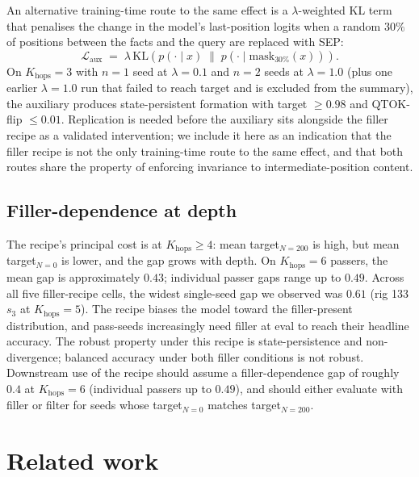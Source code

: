 \documentclass[11pt]{article}
\begin{document}
An alternative training-time route to the same effect is a
$\lambda$-weighted KL term that penalises the change in the model's
last-position logits when a random $30\%$ of positions between the
facts and the query are replaced with SEP:
\[
  \mathcal{L}_{\mathrm{aux}} \;=\;
  \lambda \, \mathrm{KL}\!\left(
    p(\cdot \mid x)\;\|\;p(\cdot \mid \mathrm{mask}_{30\%}(x))
  \right).
\]
On $K_{\mathrm{hops}} = 3$ with $n = 1$ seed at $\lambda = 0.1$ and
$n = 2$ seeds at $\lambda = 1.0$ (plus one earlier $\lambda = 1.0$
run that failed to reach target and is excluded from the summary),
the auxiliary produces state-persistent formation with target
$\ge 0.98$ and QTOK-flip $\le 0.01$.
Replication is needed before the auxiliary sits alongside the filler
recipe as a validated intervention; we include it here as an
indication that the filler recipe is not the only training-time
route to the same effect, and that both routes share the property of
enforcing invariance to intermediate-position content.

\subsection{Filler-dependence at depth}
\label{sec:filler-dep}

The recipe's principal cost is at $K_{\mathrm{hops}} \ge 4$: mean
target$_{N=200}$ is high, but mean target$_{N=0}$ is lower, and the
gap grows with depth. On $K_{\mathrm{hops}} = 6$ passers, the mean
gap is approximately $0.43$; individual passer gaps range up to
$0.49$. Across all five filler-recipe cells, the widest single-seed
gap we observed was $0.61$ (rig 133 $s_3$ at $K_{\mathrm{hops}}=5$). The recipe biases the model toward the filler-present
distribution, and pass-seeds increasingly need filler at eval to
reach their headline accuracy. The robust property under this recipe is state-persistence and
non-divergence; balanced accuracy under both filler conditions is
not robust. Downstream use of the recipe should assume a
filler-dependence gap of roughly $0.4$ at $K_{\mathrm{hops}}=6$
(individual passers up to $0.49$), and should either evaluate
with filler or filter for seeds whose target$_{N=0}$ matches
target$_{N=200}$.

\section{Related work}
\label{sec:related}
\end{document}
